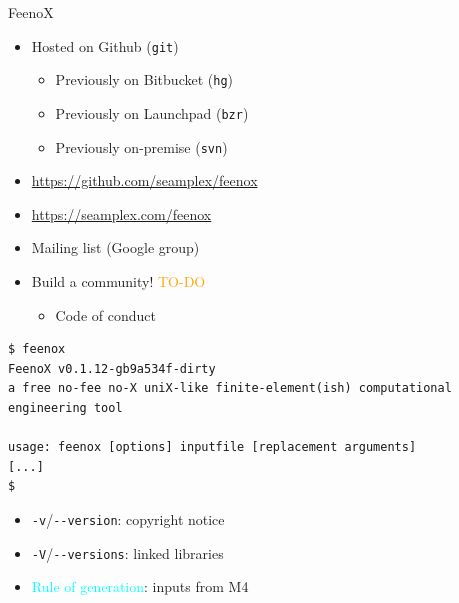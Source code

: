 \documentclass[
  ignorenonframetext,
  aspectratio=169,
]{beamer}
\newcommand{\passthrough}[1]{#1}
\providecommand{\tightlist}{%
  \setlength{\itemsep}{0pt}\setlength{\parskip}{0pt}}
\begin{document}
\begin{frame}[fragile]{}
\begin{columns}[T]
\pause

\begin{column}{0.5\textwidth}
\begin{exampleblock}{FeenoX}
\protect\hypertarget{feenox-9}{}
\begin{itemize}
\tightlist
\item
  Hosted on Github (\passthrough{\lstinline!git!})

  \begin{itemize}
  \tightlist
  \item
    Previously on Bitbucket (\passthrough{\lstinline!hg!})
  \item
    Previously on Launchpad (\passthrough{\lstinline!bzr!})
  \item
    Previously on-premise (\passthrough{\lstinline!svn!})
  \end{itemize}
\item
  \url{https://github.com/seamplex/feenox}
\item
  \url{https://seamplex.com/feenox}
\item
  Mailing list (Google group)
\item
  Build a community! \textcolor{Orange}{TO-DO}

  \begin{itemize}
  \tightlist
  \item
    Code of conduct
  \end{itemize}
\end{itemize}

\begin{lstlisting}[style=terminal]
$ feenox
FeenoX v0.1.12-gb9a534f-dirty 
a free no-fee no-X uniX-like finite-element(ish) computational engineering tool

usage: feenox [options] inputfile [replacement arguments]
[...]
$
\end{lstlisting}

\begin{itemize}
\item
  \passthrough{\lstinline!-v!}/\passthrough{\lstinline!--version!}:
  copyright notice
\item
  \passthrough{\lstinline!-V!}/\passthrough{\lstinline!--versions!}:
  linked libraries
\item
  {\textcolor{cyan}{Rule of {generation}}}: inputs from M4
\end{itemize}
\end{exampleblock}
\end{column}
\end{columns}
\end{frame}
\end{document}
